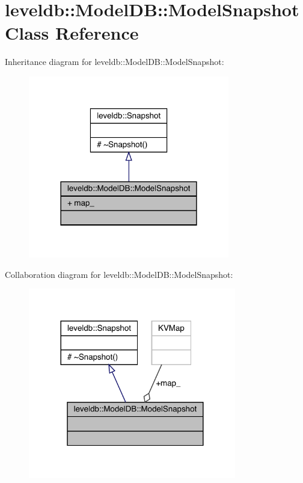 \hypertarget{classleveldb_1_1_model_d_b_1_1_model_snapshot}{}\section{leveldb\+::Model\+DB\+::Model\+Snapshot Class Reference}
\label{classleveldb_1_1_model_d_b_1_1_model_snapshot}


Inheritance diagram for leveldb\+::Model\+DB\+::Model\+Snapshot\+:
\nopagebreak
\begin{figure}[H]
\begin{center}
\leavevmode
\includegraphics[width=249pt]{classleveldb_1_1_model_d_b_1_1_model_snapshot__inherit__graph}
\end{center}
\end{figure}


Collaboration diagram for leveldb\+::Model\+DB\+::Model\+Snapshot\+:
\nopagebreak
\begin{figure}[H]
\begin{center}
\leavevmode
\includegraphics[width=257pt]{classleveldb_1_1_model_d_b_1_1_model_snapshot__coll__graph}
\end{center}
\end{figure}
